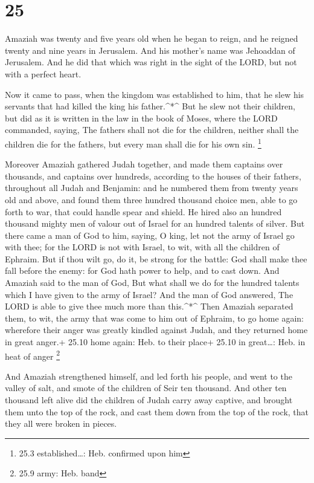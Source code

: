 \hypertarget{section-24}{%
\section{25}\label{section-24}}

 Amaziah was twenty and five years old when he began to
reign, and he reigned twenty and nine years in Jerusalem. And his
mother's name was Jehoaddan of Jerusalem.  And he did that
which was right in the sight of the LORD, but not with a perfect heart.

 Now it came to pass, when the kingdom was established to
him, that he slew his servants that had killed the king his
father.\^{}*\^{}  But he slew not their children, but did as
it is written in the law in the book of Moses, where the LORD commanded,
saying, The fathers shall not die for the children, neither shall the
children die for the fathers, but every man shall die for his own sin.
\footnote{25.3 established\ldots: Heb. confirmed upon him}

 Moreover Amaziah gathered Judah together, and made them
captains over thousands, and captains over hundreds, according to the
houses of their fathers, throughout all Judah and Benjamin: and he
numbered them from twenty years old and above, and found them three
hundred thousand choice men, able to go forth to war, that could handle
spear and shield.  He hired also an hundred thousand mighty
men of valour out of Israel for an hundred talents of silver.
 But there came a man of God to him, saying, O king, let not
the army of Israel go with thee; for the LORD is not with Israel, to
wit, with all the children of Ephraim.  But if thou wilt go,
do it, be strong for the battle: God shall make thee fall before the
enemy: for God hath power to help, and to cast down.  And
Amaziah said to the man of God, But what shall we do for the hundred
talents which I have given to the army of Israel? And the man of God
answered, The LORD is able to give thee much more than this.\^{}*\^{}
 Then Amaziah separated them, to wit, the army that was
come to him out of Ephraim, to go home again: wherefore their anger was
greatly kindled against Judah, and they returned home in great anger.+
25.10 home again: Heb. to their place+ 25.10 in great\ldots: Heb. in
heat of anger \footnote{25.9 army: Heb. band}

 And Amaziah strengthened himself, and led forth his
people, and went to the valley of salt, and smote of the children of
Seir ten thousand.  And other ten thousand left alive did
the children of Judah carry away captive, and brought them unto the top
of the rock, and cast them down from the top of the rock, that they all
were broken in pieces.

